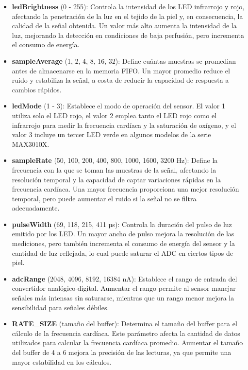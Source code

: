 \documentclass[
  letterpaper,
  DIV=11,
  numbers=noendperiod]{scrreport}
\providecommand{\tightlist}{%
  \setlength{\itemsep}{0pt}\setlength{\parskip}{0pt}}\usepackage{longtable,booktabs,array}
\begin{document}
\begin{itemize}
\tightlist
\item
  \textbf{ledBrightness} (0 - 255): Controla la intensidad de los LED
  infrarrojo y rojo, afectando la penetración de la luz en el tejido de
  la piel y, en consecuencia, la calidad de la señal obtenida. Un valor
  más alto aumenta la intensidad de la luz, mejorando la detección en
  condiciones de baja perfusión, pero incrementa el consumo de energía.
\item
  \textbf{sampleAverage} (1, 2, 4, 8, 16, 32): Define cuántas muestras
  se promedian antes de almacenarse en la memoria FIFO. Un mayor
  promedio reduce el ruido y estabiliza la señal, a costa de reducir la
  capacidad de respuesta a cambios rápidos.
\item
  \textbf{ledMode} (1 - 3): Establece el modo de operación del sensor.
  El valor 1 utiliza solo el LED rojo, el valor 2 emplea tanto el LED
  rojo como el infrarrojo para medir la frecuencia cardíaca y la
  saturación de oxígeno, y el valor 3 incluye un tercer LED verde en
  algunos modelos de la serie MAX3010X.
\item
  \textbf{sampleRate} (50, 100, 200, 400, 800, 1000, 1600, 3200 Hz):
  Define la frecuencia con la que se toman las muestras de la señal,
  afectando la resolución temporal y la capacidad de captar variaciones
  rápidas en la frecuencia cardíaca. Una mayor frecuencia proporciona
  una mejor resolución temporal, pero puede aumentar el ruido si la
  señal no se filtra adecuadamente.
\item
  \textbf{pulseWidth} (69, 118, 215, 411 µs): Controla la duración del
  pulso de luz emitido por los LED. Un mayor ancho de pulso mejora la
  resolución de las mediciones, pero también incrementa el consumo de
  energía del sensor y la cantidad de luz reflejada, lo cual puede
  saturar el ADC en ciertos tipos de piel.
\item
  \textbf{adcRange} (2048, 4096, 8192, 16384 nA): Establece el rango de
  entrada del convertidor analógico-digital. Aumentar el rango permite
  al sensor manejar señales más intensas sin saturarse, mientras que un
  rango menor mejora la sensibilidad para señales débiles.
\item
  \textbf{RATE\_SIZE} (tamaño del buffer): Determina el tamaño del
  buffer para el cálculo de la frecuencia cardíaca. Este parámetro
  afecta la cantidad de datos utilizados para calcular la frecuencia
  cardíaca promedio. Aumentar el tamaño del buffer de 4 a 6 mejora la
  precisión de las lecturas, ya que permite una mayor estabilidad en los
  cálculos.
\end{itemize}
\end{document}
